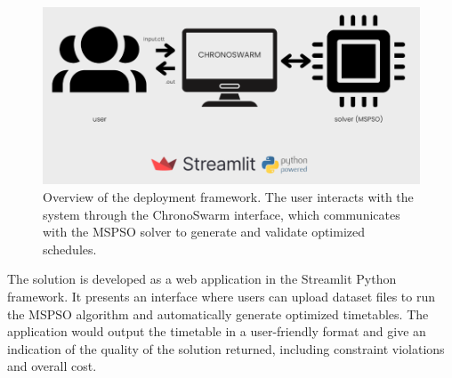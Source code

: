 \begin{figure}[H]
    \centering
    \includegraphics[width=\textwidth]{deployment.png} 
    \caption{Overview of the deployment framework. The user interacts with the system through the ChronoSwarm interface, which communicates with the MSPSO solver to generate and validate optimized schedules.}
    \label{fig:deployment_framework}
\end{figure}

The solution is developed as a web application in the Streamlit Python framework. It presents an interface where users can upload dataset files to run the MSPSO algorithm and automatically generate optimized timetables. The application would output the timetable in a user-friendly format and give an indication of the quality of the solution returned, including constraint violations and overall cost.
